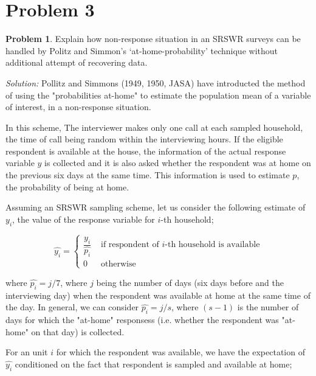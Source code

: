 \documentclass[12pt]{article}
\theoremstyle{definition}
\newtheorem*{prb}{Problem}
\newenvironment{problem}{
\begin{tcolorbox}[colback=blue!5!white,colframe=blue!75!black, parbox = true] \begin{prb}  }{\end{prb}\end{tcolorbox} }
\newenvironment{answer}{\textit{Solution: }\quad }{ \hfill \qedsymbol}
\begin{document}
\section{Problem 3}

\begin{problem}
	Explain how non-response situation in an SRSWR surveys can be handled by Politz and Simmon's `at-home-probability' technique without additional attempt of recovering data. 
\end{problem}

\begin{answer}
	Pollitz and Simmons (1949, 1950, JASA) have introducted the method of using the "probabilities at-home" to estimate the population mean of a variable of interest, in a non-response situation. 

	In this scheme, The interviewer makes only one call at each sampled household, the time of call being random within the interviewing hours. If the eligible respondent is available
	at the house, the information of the actual response variable $y$ is collected and it is also asked whether the respondent was at home on the previous six days at the same time. This information is used to estimate $p$, the probability of being at home.

	Assuming an SRSWR sampling scheme, let us consider the following estimate of $y_i$, the value of the response variable for $i$-th household;

	$$\widehat{y_i} = \begin{cases}
		\dfrac{y_i}{\widehat{p_i}} & \text{ if respondent of } i\text{-th household is available}\\
		0 & \text{ otherwise}
	\end{cases}$$

	where $\widehat{p_i} = j/7$, where $j$ being the number of days (six days before and the interviewing day) when the respondent was available at home at the same time of the day. In general, we can consider $\widehat{p_i} = j/s$, where $(s-1)$ is the number of days for which the "at-home" responsess (i.e. whether the respondent was "at-home" on that day) is collected.

	For an unit $i$ for which the respondent was available, we have the expectation of $\widehat{y_i}$ conditioned on the fact that respondent is sampled and available at home;


\end{answer}
\end{document}
